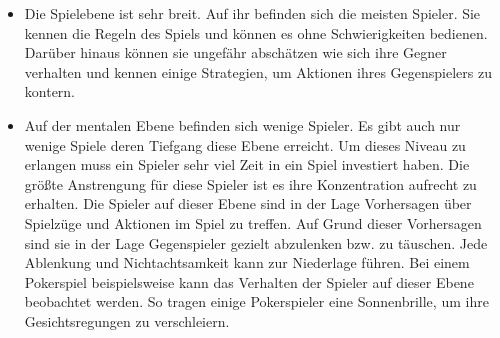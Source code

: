 \begin{description}
\begin{itemize}
\item Die Spielebene ist sehr breit. Auf ihr befinden sich die meisten Spieler. Sie kennen die Regeln des Spiels und können es ohne Schwierigkeiten bedienen. Darüber hinaus können sie ungefähr abschätzen wie sich ihre Gegner verhalten und kennen einige Strategien, um Aktionen ihres Gegenspielers zu kontern.

\item Auf der mentalen Ebene befinden sich wenige Spieler. Es gibt auch nur wenige Spiele deren Tiefgang diese Ebene erreicht. Um dieses Niveau zu erlangen muss ein Spieler sehr viel Zeit in ein Spiel investiert haben. Die größte Anstrengung für diese Spieler ist es ihre Konzentration aufrecht zu erhalten. Die Spieler auf dieser Ebene sind in der Lage Vorhersagen über Spielzüge und Aktionen im Spiel zu treffen. Auf Grund dieser Vorhersagen sind sie in der Lage Gegenspieler gezielt abzulenken bzw. zu täuschen. Jede Ablenkung und Nichtachtsamkeit kann zur Niederlage führen. Bei einem Pokerspiel beispielsweise kann das Verhalten der Spieler auf dieser Ebene beobachtet werden. So tragen einige Pokerspieler eine Sonnenbrille, um ihre Gesichtsregungen zu verschleiern. \cite[S. 71]{Adams:1515529}


\end{itemize}
\end{description}
